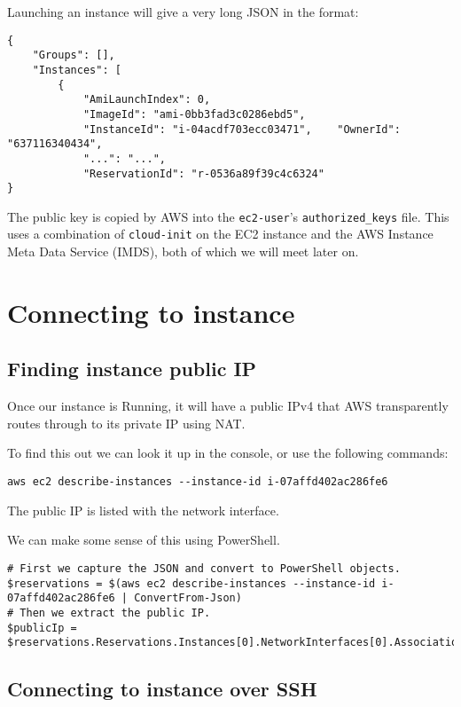 \documentclass{pgnotes}
\begin{document}
Launching an instance will give a very long JSON in the format:

\begin{verbatim}
{
    "Groups": [],
    "Instances": [
        {
            "AmiLaunchIndex": 0,
            "ImageId": "ami-0bb3fad3c0286ebd5",
            "InstanceId": "i-04acdf703ecc03471",    "OwnerId": "637116340434",
            "...": "...",
            "ReservationId": "r-0536a89f39c4c6324"
}
\end{verbatim}

The public key is copied by AWS into the \texttt{ec2-user}'s \texttt{authorized\_keys} file.
This uses a combination of \texttt{cloud-init} on the EC2 instance and the AWS Instance Meta Data Service (IMDS), both of which we will meet later on.

\section{Connecting to instance}
\label{sec:connecting-to-instance}

\subsection{Finding instance public IP}
\label{sec:finding-instance-public-ip}

Once our instance is Running, it will have a public IPv4 that AWS transparently routes through to its private IP using NAT.

To find this out we can look it up in the console, or use the following commands:
\begin{verbatim}
aws ec2 describe-instances --instance-id i-07affd402ac286fe6
\end{verbatim}
The public IP is listed with the network interface.

We can make some sense of this using PowerShell.

\begin{verbatim}
# First we capture the JSON and convert to PowerShell objects.
$reservations = $(aws ec2 describe-instances --instance-id i-07affd402ac286fe6 | ConvertFrom-Json)
# Then we extract the public IP.
$publicIp = $reservations.Reservations.Instances[0].NetworkInterfaces[0].Association.publicIp
\end{verbatim}

\subsection{Connecting to instance over SSH}
\label{sec:connecting-to-instance-over-ssh}
\end{document}
